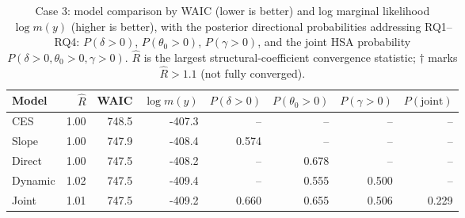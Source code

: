 \begin{table}[H]\centering\small
\caption{Case 3: model comparison by WAIC (lower is better) and log marginal likelihood $\log m(y)$ (higher is better), with the posterior directional probabilities addressing RQ1--RQ4: $P(\delta>0)$, $P(\theta_0>0)$, $P(\gamma>0)$, and the joint HSA probability $P(\delta>0,\theta_0>0,\gamma>0)$. $\hat R$ is the largest structural-coefficient convergence statistic; $\dagger$ marks $\hat R>1.1$ (not fully converged).}
\label{tab:case3_cmp}
\begin{tabular}{lrrrrrrr}\toprule
Model & $\hat R$ & WAIC & $\log m(y)$ & $P(\delta{>}0)$ & $P(\theta_0{>}0)$ & $P(\gamma{>}0)$ & $P(\text{joint})$ \\\midrule
CES & 1.00 & 748.5 & -407.3 & -- & -- & -- & -- \\
Slope & 1.00 & 747.9 & -408.4 & 0.574 & -- & -- & -- \\
Direct & 1.00 & 747.5 & -408.2 & -- & 0.678 & -- & -- \\
Dynamic & 1.02 & 747.5 & -409.4 & -- & 0.555 & 0.500 & -- \\
Joint & 1.01 & 747.5 & -409.2 & 0.660 & 0.655 & 0.506 & 0.229 \\
\bottomrule\end{tabular}\end{table}
